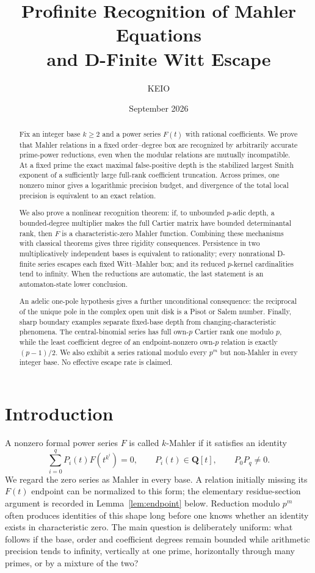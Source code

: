 \documentclass[11pt,reqno]{amsart}
\title[Profinite Mahler recognition]{Profinite Recognition of Mahler Equations\\
and D-Finite Witt Escape}
\author{KEIO}
\date{September 2026}
\theoremstyle{definition}
\theoremstyle{remark}
\newcommand{\Q}{\mathbf Q}
\begin{document}
\begin{abstract}
Fix an integer base $k\geq2$ and a power series $F(t)$ with rational
coefficients.  We prove
that Mahler relations in a fixed order--degree box are recognized by
arbitrarily accurate prime-power reductions, even when the modular
relations are mutually incompatible.  At a fixed prime the exact maximal
false-positive depth is the stabilized largest Smith exponent of a
sufficiently large full-rank coefficient truncation.  Across primes, one
nonzero minor gives a logarithmic precision budget, and divergence of the
total local precision is equivalent to an exact relation.

We also prove a nonlinear recognition theorem: if, to unbounded $p$-adic
depth, a bounded-degree multiplier makes the full Cartier matrix have
bounded determinantal rank, then $F$ is a characteristic-zero Mahler
function.  Combining these mechanisms with classical theorems gives three
rigidity consequences.  Persistence in two multiplicatively independent
bases is equivalent to rationality; every nonrational D-finite series
escapes each fixed Witt--Mahler box; and its reduced $p$-kernel cardinalities
tend to infinity.  When the reductions are automatic, the last statement
is an automaton-state lower conclusion.

An adelic one-pole hypothesis gives a further unconditional consequence:
the reciprocal of the unique pole in the complex open unit disk is a Pisot
or Salem number.  Finally, sharp boundary examples separate fixed-base
depth from changing-characteristic phenomena.  The central-binomial series
has full own-$p$ Cartier rank one modulo $p$, while the least coefficient
degree of an endpoint-nonzero own-$p$ relation is exactly $(p-1)/2$.  We
also exhibit a series rational modulo every $p^m$ but non-Mahler in every
integer base.  No effective escape rate is claimed.
\end{abstract}

\maketitle

\section{Introduction}

A nonzero formal power series $F$ is called $k$-Mahler if it satisfies an
identity
\begin{equation}\label{eq:mahler}
 \sum_{i=0}^{q}P_i(t)F(t^{k^i})=0,
 \qquad P_i(t)\in\Q[t],\qquad P_0P_q\ne0.
\end{equation}
We regard the zero series as Mahler in every base.  A relation initially
missing its $F(t)$ endpoint can be normalized to this form; the elementary
residue-section argument is recorded in Lemma~\ref{lem:endpoint} below.
Reduction modulo $p^m$ often produces identities of this shape long before
one knows whether an identity exists in characteristic zero.  The main
question is deliberately uniform: what follows if the base, order and
coefficient degrees remain bounded while arithmetic precision tends to
infinity, vertically at one prime, horizontally through many primes, or by
a mixture of the two?
\end{document}
